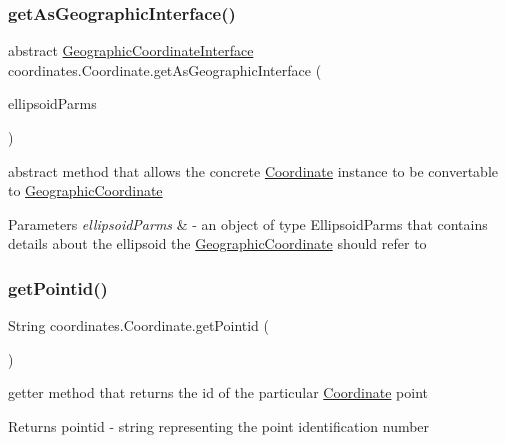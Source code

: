 \subsubsection{\texorpdfstring{get\+As\+Geographic\+Interface()}{getAsGeographicInterface()}}
{\footnotesize\ttfamily abstract \hyperlink{classcoordinates_1_1_geographic_coordinate_interface}{Geographic\+Coordinate\+Interface} coordinates.\+Coordinate.\+get\+As\+Geographic\+Interface (\begin{DoxyParamCaption}\item[{\hyperlink{classparams_1_1_ellipsoid_parms}{Ellipsoid\+Parms}}]{ellipsoid\+Parms }\end{DoxyParamCaption})\hspace{0.3cm}{\ttfamily [abstract]}}



abstract method that allows the concrete \hyperlink{classcoordinates_1_1_coordinate}{Coordinate} instance to be convertable to \hyperlink{classcoordinates_1_1_geographic_coordinate}{Geographic\+Coordinate} 


\begin{DoxyParams}{Parameters}
{\em ellipsoid\+Parms} & -\/ an object of type Ellipsoid\+Parms that contains details about the ellipsoid the \hyperlink{classcoordinates_1_1_geographic_coordinate}{Geographic\+Coordinate} should refer to \\
\hline
\end{DoxyParams}
\mbox{\label{classcoordinates_1_1_coordinate_ab0b1d8dc4fe371a2425e0cb505effafd}} 
\subsubsection{\texorpdfstring{get\+Pointid()}{getPointid()}}
{\footnotesize\ttfamily String coordinates.\+Coordinate.\+get\+Pointid (\begin{DoxyParamCaption}{ }\end{DoxyParamCaption})}



getter method that returns the id of the particular \hyperlink{classcoordinates_1_1_coordinate}{Coordinate} point 

\begin{DoxyReturn}{Returns}
pointid -\/ string representing the point identification number 
\end{DoxyReturn}
\mbox{\label{classcoordinates_1_1_coordinate_af2882da7117d4a312faf707df681042c}} 
